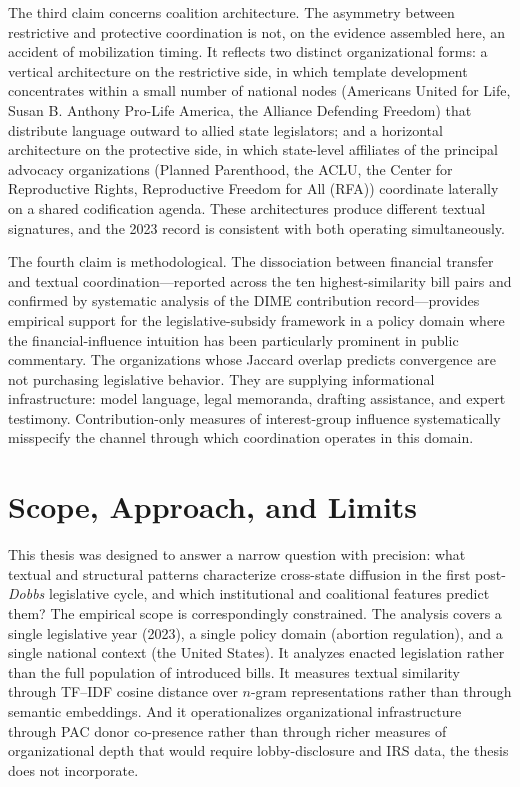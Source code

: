 The third claim concerns coalition architecture. The asymmetry between restrictive and protective coordination is not, on the evidence assembled here, an accident of mobilization timing. It reflects two distinct organizational forms: a vertical architecture on the restrictive side, in which template development concentrates within a small number of national nodes (Americans United for Life, Susan B. Anthony Pro-Life America, the Alliance Defending Freedom) that distribute language outward to allied state legislators; and a horizontal architecture on the protective side, in which state-level affiliates of the principal advocacy organizations (Planned Parenthood, the ACLU, the Center for Reproductive Rights, Reproductive Freedom for All (RFA)) coordinate laterally on a shared codification agenda. These architectures produce different textual signatures, and the 2023 record is consistent with both operating simultaneously.

The fourth claim is methodological. The dissociation between financial transfer and textual coordination---reported across the ten highest-similarity bill pairs and confirmed by systematic analysis of the DIME contribution record---provides empirical support for the \textcite{hallLobbyingLegislativeSubsidy2006a} legislative-subsidy framework in a policy domain where the financial-influence intuition has been particularly prominent in public commentary. The organizations whose Jaccard overlap predicts convergence are not purchasing legislative behavior. They are supplying informational infrastructure: model language, legal memoranda, drafting assistance, and expert testimony. Contribution-only measures of interest-group influence systematically misspecify the channel through which coordination operates in this domain.

\section{Scope, Approach, and Limits}

This thesis was designed to answer a narrow question with precision: what textual and structural patterns characterize cross-state diffusion in the first post-\textit{Dobbs} legislative cycle, and which institutional and coalitional features predict them? The empirical scope is correspondingly constrained. The analysis covers a single legislative year (2023), a single policy domain (abortion regulation), and a single national context (the United States). It analyzes enacted legislation rather than the full population of introduced bills. It measures textual similarity through TF--IDF cosine distance over $n$-gram representations rather than through semantic embeddings. And it operationalizes organizational infrastructure through PAC donor co-presence rather than through richer measures of organizational depth that would require lobby-disclosure and IRS data, the thesis does not incorporate.

